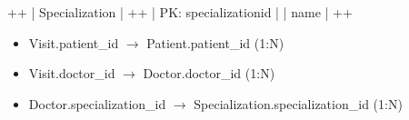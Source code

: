 \documentclass[a4paper,11pt,openany,english]{sphinxmanual}
\begin{document}
\begin{sphinxVerbatim}[commandchars=\\\{\}]
+\PYGZhy{}\PYGZhy{}\PYGZhy{}\PYGZhy{}\PYGZhy{}\PYGZhy{}\PYGZhy{}\PYGZhy{}\PYGZhy{}\PYGZhy{}\PYGZhy{}\PYGZhy{}\PYGZhy{}\PYGZhy{}\PYGZhy{}\PYGZhy{}\PYGZhy{}\PYGZhy{}\PYGZhy{}\PYGZhy{}+
|  Specialization    |
+\PYGZhy{}\PYGZhy{}\PYGZhy{}\PYGZhy{}\PYGZhy{}\PYGZhy{}\PYGZhy{}\PYGZhy{}\PYGZhy{}\PYGZhy{}\PYGZhy{}\PYGZhy{}\PYGZhy{}\PYGZhy{}\PYGZhy{}\PYGZhy{}\PYGZhy{}\PYGZhy{}\PYGZhy{}\PYGZhy{}+
| PK: specialization\PYGZus{}id |
| name               |
+\PYGZhy{}\PYGZhy{}\PYGZhy{}\PYGZhy{}\PYGZhy{}\PYGZhy{}\PYGZhy{}\PYGZhy{}\PYGZhy{}\PYGZhy{}\PYGZhy{}\PYGZhy{}\PYGZhy{}\PYGZhy{}\PYGZhy{}\PYGZhy{}\PYGZhy{}\PYGZhy{}\PYGZhy{}\PYGZhy{}+
\end{sphinxVerbatim}
\begin{description}
\begin{itemize}
\item {} 
\sphinxAtStartPar
Visit.patient\_id \(\rightarrow\) Patient.patient\_id (1:N)

\item {} 
\sphinxAtStartPar
Visit.doctor\_id  \(\rightarrow\) Doctor.doctor\_id  (1:N)

\item {} 
\sphinxAtStartPar
Doctor.specialization\_id \(\rightarrow\) Specialization.specialization\_id (1:N)

\end{itemize}

\end{description}
\end{document}
